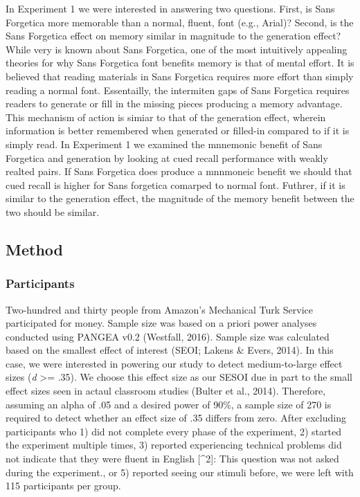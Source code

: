 \documentclass[doc]{apa6}
\begin{document}
In Experiment 1 we were interested in answering two questions. First, is Sans Forgetica more memorable than a normal, fluent, font (e.g., Arial)? Second, is the Sans Forgetica effect on memory similar in magnitude to the generation effect? While very is known about Sans Forgetica, one of the most intuitively appealing theories for why Sans Forgetica font benefits memory is that of mental effort. It is believed that reading materials in Sans Forgetica requires more effort than simply reading a normal font. Essentailly, the intermiten gaps of Sans Forgetica requires readers to generate or fill in the missing pieces producing a memory advantage. This mechanism of action is simiar to that of the generation effect, wherein information is better remembered when generated or filled-in compared to if it is simply read. In Experiment 1 we examined the mnnemonic benefit of Sans Forgetica and generation by looking at cued recall performance with weakly realted pairs. If Sans Forgetica does produce a mnnmoneic benefit we should that cued recall is higher for Sans forgetica comarped to normal font. Futhrer, if it is similar to the generation effect, the magnitude of the memory benefit between the two should be similar.

\hypertarget{method}{%
\subsection{Method}\label{method}}

\hypertarget{participants}{%
\subsubsection{Participants}\label{participants}}

Two-hundred and thirty people from Amazon's Mechanical Turk Service participated for money. Sample size was based on a priori power analyses conducted using PANGEA v0.2 (Westfall, 2016). Sample size was calculated based on the smallest effect of interest (SEOI; Lakens \& Evers, 2014). In this case, we were interested in powering our study to detect medium-to-large effect sizes (\emph{d} \textgreater{}= .35). We choose this effect size as our SESOI due in part to the small effect sizes seen in actaul classroom studies (Bulter et al., 2014). Therefore, assuming an alpha of .05 and a desired power of 90\%, a sample size of 270 is required to detect whether an effect size of .35 differs from zero. After excluding participants who 1) did not complete every phase of the experiment, 2) started the experiment multiple times, 3) reported experiencing technical problems did not indicate that they were fluent in English {[}\^{}2{]}: This question was not asked during the experiment., or 5) reported seeing our stimuli before, we were left with 115 participants per group.
\end{document}
